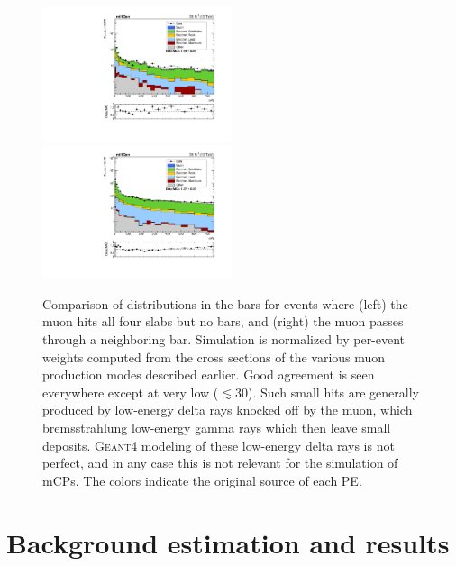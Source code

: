 {\begin{figure}[t]
  \begin{center}
    \includegraphics[width=0.495\textwidth]{figs/milliq/npe_comp_slabNoBar.pdf}
    \includegraphics[width=0.495\textwidth]{figs/milliq/npe_comp_neighbBars.pdf}
    \caption{Comparison of \Npe distributions in the bars for events where
      (left) the muon hits all four slabs but no bars, and (right) the muon
      passes through a neighboring bar. Simulation is normalized by per-event weights
      computed from the cross sections of the various muon production modes described earlier.
      Good agreement is seen everywhere
      except at very low \Npe ($\lesssim30$). Such small hits are generally produced
      by low-energy delta rays knocked off by the muon, which bremsstrahlung
      low-energy gamma rays which then leave small deposits. \textsc{Geant4} modeling
      of these low-energy delta rays is not perfect, and in any case this is not
      relevant for the simulation of mCPs. The colors indicate the original source
      of each PE.
            }
    \label{fig:npe_comps}
  \end{center}
\end{figure}

\section{Background estimation and results}

}
